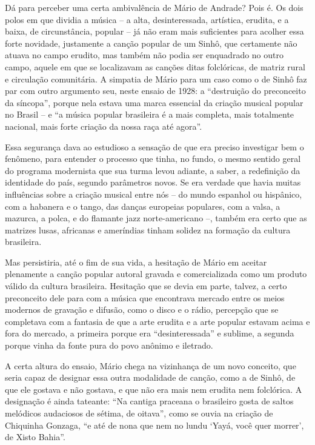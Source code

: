Dá para perceber uma certa ambivalência de Mário de Andrade? Pois é. Os
dois polos em que dividia a música -- a alta, desinteressada, artística,
erudita, e a baixa, de circunstância, popular -- já não eram mais
suficientes para acolher essa forte novidade, justamente a canção
popular de um Sinhô, que certamente não atuava no campo erudito, mas
também não podia ser enquadrado no outro campo, aquele em que se
localizavam as canções ditas folclóricas, de matriz rural e circulação
comunitária. A simpatia de Mário para um caso como o de Sinhô faz par
com outro argumento seu, neste ensaio de 1928: a ``destruição do
preconceito da síncopa'', porque nela estava uma marca essencial da
criação musical popular no Brasil -- e ``a música popular brasileira é a
mais completa, mais totalmente nacional, mais forte criação da nossa
raça até agora''.

Essa segurança dava ao estudioso a sensação de que era preciso
investigar bem o fenômeno, para entender o processo que tinha, no fundo,
o mesmo sentido geral do programa modernista que sua turma levou
adiante, a saber, a redefinição da identidade do país, segundo
parâmetros novos. Se era verdade que havia muitas influências sobre a
criação musical entre nós -- do mundo espanhol ou hispânico, com a
habanera e o tango, das danças europeias populares, com a valsa, a
mazurca, a polca, e do flamante jazz norte-americano --, também era
certo que as matrizes lusas, africanas e ameríndias tinham solidez na
formação da cultura brasileira.

Mas persistiria, até o fim de sua vida, a hesitação de Mário em aceitar
plenamente a canção popular autoral gravada e comercializada como um
produto válido da cultura brasileira. Hesitação que se devia em parte,
talvez, a certo preconceito dele para com a música que encontrava
mercado entre os meios modernos de gravação e difusão, como o disco e o
rádio, percepção que se completava com a fantasia de que a arte erudita
e a arte popular estavam acima e fora do mercado, a primeira porque era
``desinteressada'' e sublime, a segunda porque vinha da fonte pura do
povo anônimo e iletrado.

A certa altura do ensaio, Mário chega na vizinhança de um novo conceito,
que seria capaz de designar essa outra modalidade de canção, como a de
Sinhô, de que ele gostava e não gostava, e que não era mais nem erudita
nem folclórica. A designação é ainda tateante: ``Na cantiga praceana o
brasileiro gosta de saltos melódicos audaciosos de sétima, de oitava'',
como se ouvia na criação de Chiquinha Gonzaga, ``e até de nona que nem
no lundu `Yayá, você quer morrer', de Xisto Bahia''.

